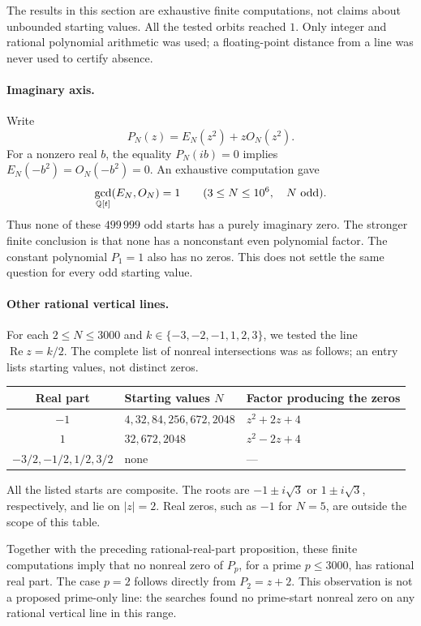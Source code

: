 \documentclass[11pt,a4paper]{article}
\theoremstyle{definition}
\theoremstyle{remark}
\numberwithin{equation}{section}
\begin{document}
The results in this section are exhaustive finite computations, not claims
about unbounded starting values. All the tested orbits reached $1$.
Only integer and rational polynomial arithmetic was used; a floating-point
distance from a line was never used to certify absence.

\paragraph{Imaginary axis.}
Write
\[
 P_N(z)=E_N(z^2)+zO_N(z^2).
\]
For a nonzero real $b$, the equality $P_N(ib)=0$ implies
$E_N(-b^2)=O_N(-b^2)=0$. An exhaustive computation gave
\[
 \gcd_{\mathbb Q[t]}(E_N,O_N)=1
 \qquad(3\leq N\leq10^6,\quad N\ \hbox{odd}).
\]
Thus none of these $499\,999$ odd starts has a purely imaginary zero.
The stronger finite conclusion is that none has a nonconstant even
polynomial factor. The constant polynomial $P_1=1$ also has no zeros.
This does not settle the same question for every odd starting value.

\paragraph{Other rational vertical lines.}
For each $2\leq N\leq3000$ and
$k\in\{-3,-2,-1,1,2,3\}$, we tested the line
$\operatorname{Re}z=k/2$. The complete list of nonreal intersections was
as follows; an entry lists starting values, not distinct zeros.
\begin{center}
\begin{tabular}{c l l}
\toprule
Real part & Starting values $N$ & Factor producing the zeros\\
\midrule
$-1$ & $4,32,84,256,672,2048$ & $z^2+2z+4$\\
$1$ & $32,672,2048$ & $z^2-2z+4$\\
$-3/2,-1/2,1/2,3/2$ & none & ---\\
\bottomrule
\end{tabular}
\end{center}
All the listed starts are composite. The roots are
$-1\pm i\sqrt3$ or $1\pm i\sqrt3$, respectively, and lie on $|z|=2$.
Real zeros, such as $-1$ for $N=5$, are outside the scope of this table.

Together with the preceding rational-real-part proposition, these finite
computations imply that no nonreal zero of $P_p$, for a prime $p\leq3000$,
has rational real part. The case $p=2$ follows directly from $P_2=z+2$.
This observation is not a proposed prime-only line: the searches found
no prime-start nonreal zero on any rational vertical line in this range.
\end{document}
